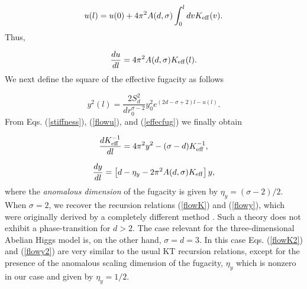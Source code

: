 \documentclass[a4paper,showpacs,preprintnumbers,amsmath,amssymb,prl,twocolumn]{revtex4}
\begin{document}
\begin{equation}
\label{udel}
u(l)=u(0)+4\pi^2A(d,\sigma)\int_0^l dv K_{\rm eff}(v).
\end{equation}
Thus, 

\begin{equation}
\label{flowu}
\frac{du}{dl}=4\pi^2A(d,\sigma)K_{\rm eff}(l).
\end{equation}
We next define the square of the effective fugacity as follows

\begin{equation}
\label{effecfug}
y^2(l)=\frac{2S_d^2}{d r_0^{\sigma-2}}y_0^2 e^{(2d-\sigma+2)l-u(l)}.
\end{equation}
From Eqs. (\ref{stiffness}), (\ref{flowu}), and (\ref{effecfug})  
we finally obtain

\begin{equation}
\label{flowK2}
\frac{d K_{\rm eff}^{-1}}{dl}=4\pi^2y^2-(\sigma-d)K_{\rm eff}^{-1},
\end{equation}

\begin{equation}
\label{flowy2}
\frac{dy}{dl}=\left[d-\eta_y-2\pi^2A(d,\sigma)K_{\rm eff}\right]y,
\end{equation}
where the {\it anomalous dimension} of the fugacity is given by 
$\eta_y=(\sigma-2)/2$. When $\sigma=2$, we recover the recursion relations 
(\ref{flowK}) and (\ref{flowy}), which were originally derived by a 
completely different method \cite{Kosterlitz}. Such a theory does not 
exhibit a phase-transition for $d>2$. The case relevant for the three-dimensional 
Abelian Higgs model is, on the other hand, $\sigma=d=3$. In this case 
Eqs. (\ref{flowK2}) and (\ref{flowy2}) are very similar to the usual KT 
recursion relations, except for the presence of the anomalous scaling 
dimension of the fugacity, $\eta_y$ which is nonzero in our case and 
given by $\eta_y=1/2$. 
\end{document}
